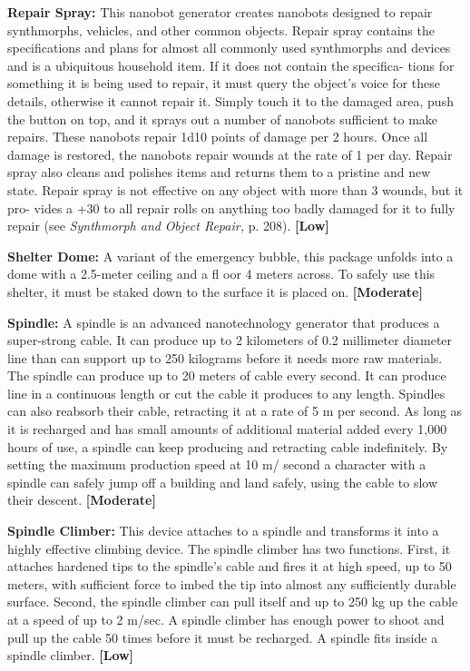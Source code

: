 \textbf{Repair Spray: }This nanobot generator creates 
nanobots designed to repair synthmorphs, vehicles, 
and other common objects. Repair spray contains 
the specifications and plans for almost all commonly 
used synthmorphs and devices and is a ubiquitous 
household item. If it does not contain the specifica-
tions for something it is being used to repair, it must 
query the object's voice for these details, otherwise 
it cannot repair it. Simply touch it to the damaged 
area, push the button on top, and it sprays out a 
number of nanobots sufficient to make repairs. 
These nanobots repair 1d10 points of damage per 
2 hours. Once all damage is restored, the nanobots 
repair wounds at the rate of 1 per day. Repair spray 
also cleans and polishes items and returns them to a 
pristine and new state. Repair spray is not effective 
on any object with more than 3 wounds, but it pro-
vides a +30 to all repair rolls on anything too badly 
damaged for it to fully repair (see \textit{Synthmorph and }
\textit{Object Repair,} p. 208). \textbf{[Low]}

\textbf{Shelter Dome:} A variant of the emergency bubble, 
this package unfolds into a dome with a 2.5-meter 
ceiling and a fl oor 4 meters across. To safely use this 
shelter, it must be staked down to the surface it is 
placed on. \textbf{[Moderate]}

\textbf{Spindle: }A spindle is an advanced nanotechnology 
generator that produces a super-strong cable. It can 
produce up to 2 kilometers of 0.2 millimeter diameter 
line than can support up to 250 kilograms before it 
needs more raw materials. The spindle can produce 
up to 20 meters of cable every second. It can produce 
line in a continuous length or cut the cable it produces 
to any length. Spindles can also reabsorb their cable, 
retracting it at a rate of 5 m per second. As long as 
it is recharged and has small amounts of additional 
material added every 1,000 hours of use, a spindle 
can keep producing and retracting cable indefinitely. 
By setting the maximum production speed at 10 m/
second a character with a spindle can safely jump 
off a building and land safely, using the cable to slow 
their descent. \textbf{[Moderate]}

\textbf{Spindle Climber:} This device attaches to a spindle 
and transforms it into a highly effective climbing 
device. The spindle climber has two functions. First, it 
attaches hardened tips to the spindle's cable and fires 
it at high speed, up to 50 meters, with sufficient force 
to imbed the tip into almost any sufficiently durable 
surface. Second, the spindle climber can pull itself and 
up to 250 kg up the cable at a speed of up to 2 m/sec. 
A spindle climber has enough power to shoot and pull 
up the cable 50 times before it must be recharged. A 
spindle fits inside a spindle climber. \textbf{[Low]}


